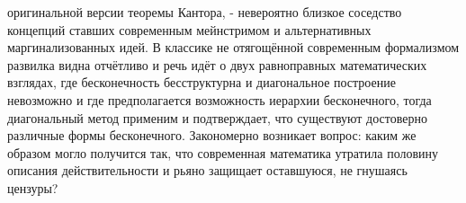 \documentclass[12pt]{article}
\begin{document}
оригинальной версии теоремы Кантора, - невероятно близкое соседство концепций ставших современным мейнстримом и альтернативных маргинализованных идей. В классике не отягощённой современным формализмом развилка видна отчётливо и речь идёт о двух равноправных математических взглядах, где бесконечность бесструктурна и диагональное построение невозможно и где предполагается возможность иерархии бесконечного, тогда диагональный метод применим и подтверждает, что существуют достоверно различные формы бесконечного. Закономерно возникает вопрос: каким же образом могло получится так, что современная математика утратила половину описания действительности и рьяно защищает оставшуюся, не гнушаясь цензуры?

\printbibliography

 
\end{document}
